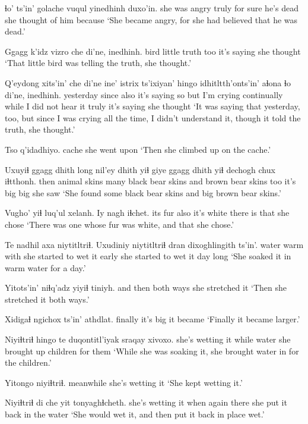 \documentclass[12pt]{article}
\begin{document}
 {ɬo' ts'in'} golache vuqul  yinedhinh  duxo'in.
{she was angry}  truly   {for sure} {he's dead} {she thought of him} because
\glt `She became angry, for she had believed that he was dead.'
\glend 

\gll Ggagg k'idz vizro che di'ne, inedhinh.
bird  little truth too {it's saying} {she thought}
\glt `That little bird was telling the truth, she thought.'
\glend 

\gll Q'eydong xits'in' che di'ne ine' istrix ts'ixiyan' hingo idhitltth'onts'in' {aɬona ɬo} di'ne, inedhinh.
yesterday since also {it's saying so} but {I'm crying} continually while {I did not hear it}  truly  {it's saying} {she thought}
\glt `It was saying that yesterday, too, but since I was crying all the time, I didn't understand it, though it told the truth, she thought.'
\glend 

\gll Tso q'idadhiyo.
cache {she went upon}
\glt `Then she climbed up on the cache.'
\glend 

\gll Uxuyiɬ ggagg  dhith long nil'ey  dhith yiɬ  {giye ggagg}  dhith yiɬ dechogh chux iɬtthonh.
then  animal  skins many {black bear} skins and {brown bear}  skins too {it's big} big {she saw}
\glt `She found some black bear skins and big brown bear skins.'
\glend 

\gll Vugho' yiɬ luq'ul  xelanh. Iy nagh iɬchet.
{its fur} also {it's white} {there is} that {} {she chose}
\glt `There was one whose fur was white, and that she chose.'
\glend 

\gll Te nadhil axa niytitltriɬ. Uxudiniy niytitltriɬ dran dixoghlingith ts'in'.
water warm  with {she started to wet it} early  {she started to wet it} day long
\glt `She soaked it in warm water for a day.'
\glend 

\gll Yitots'in' niɬq'adz {yiyiɬ tiniyh.}
{and then} {both ways} {she stretched it}
\glt `Then she stretched it both ways.'
\glend 

\gll Xidigaɬ ngichox ts'in' athdlat.
finally  {it's big} {} {it became}
\glt `Finally it became larger.'
\glend 

\gll Niyiɬtriɬ  hingo te duqontitl'iyak sraqay xivoxo.
{she's wetting it} while water {she brought up} children {for them}
\glt `While she was soaking it, she brought water in for the children.'
\glend 

\gll Yitongo niyiɬtriɬ.
meanwhile {she's wetting it}
\glt `She kept wetting it.'
\glend 

\gll Niyiɬtriɬ  di che yit tonyaghɬcheth.
{she's wetting it} when again there {she put it back in the water}
\glt `She would wet it, and then put it back in place wet.'
\glend 
\end{document}
